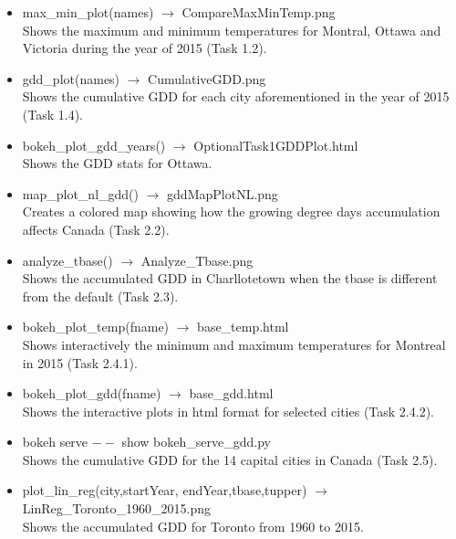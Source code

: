 \documentclass[12pt]{article}
\begin{document}
\begin{description}
\begin{itemize}
\item max\_min\_plot(names) $\to$ CompareMaxMinTemp.png \\
Shows the maximum and minimum temperatures for Montral, Ottawa and Victoria during the year of 2015 (Task 1.2).

\item gdd\_plot(names)  $\to$ CumulativeGDD.png \\
Shows the cumulative GDD for each city aforementioned in the year of 2015 (Task 1.4).

\item bokeh\_plot\_gdd\_years() $\to$ OptionalTask1GDDPlot.html \\
Shows the GDD stats for Ottawa. 

\item map\_plot\_nl\_gdd()  $\to$  gddMapPlotNL.png \\
Creates a colored map showing how the growing degree days accumulation affects Canada (Task 2.2).

\item analyze\_tbase()  $\to$ Analyze\_Tbase.png \\
Shows the accumulated GDD in Charllotetown when the tbase is different from the default (Task 2.3).

\item bokeh\_plot\_temp(fname) $\to$ base\_temp.html \\
Shows interactively the minimum and maximum temperatures for Montreal in 2015 (Task 2.4.1).

\item bokeh\_plot\_gdd(fname) $\to$ base\_gdd.html \\
Shows the interactive plots in html format for selected cities (Task 2.4.2).

\item bokeh serve $--$ show bokeh\_serve\_gdd.py \\
Shows the cumulative GDD for the 14 capital cities in Canada (Task 2.5).

\item plot\_lin\_reg(city,startYear, endYear,tbase,tupper) $\to$ LinReg\_Toronto\_1960\_2015.png \\
Shows the accumulated GDD for Toronto from 1960 to 2015.


\end{itemize}
\end{description}
\end{document}
